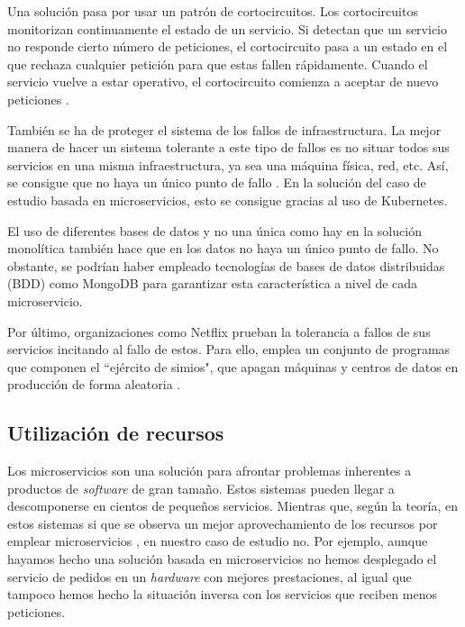 \documentclass[11pt,spanish,listoffigures]{tfgetsinf}
\begin{document}
Una solución pasa por usar un patrón de cortocircuitos. Los cortocircuitos monitorizan continuamente el estado de un servicio. Si detectan que un servicio no responde cierto número de peticiones, el cortocircuito pasa a un estado en el que rechaza cualquier petición para que estas fallen rápidamente. Cuando el servicio vuelve a estar operativo, el cortocircuito comienza a aceptar de nuevo peticiones \cite{Richards2016}.

También se ha de proteger el sistema de los fallos de infraestructura. La mejor manera de hacer un sistema tolerante a este tipo de fallos es no situar todos sus servicios en una misma infraestructura, ya sea una máquina física, red, etc. Así, se consigue que no haya un único punto de fallo \cite{Newman2015a}. En la solución del caso de estudio basada en microservicios, esto se consigue gracias al uso de Kubernetes.

El uso de diferentes bases de datos y no una única como hay en la solución monolítica también hace que en los datos no haya un único punto de fallo. No obstante, se podrían haber empleado tecnologías de bases de datos distribuidas (BDD) como MongoDB para garantizar esta característica a nivel de cada microservicio.

Por último, organizaciones como Netflix prueban la tolerancia a fallos de sus servicios incitando al fallo de estos. Para ello, emplea un conjunto de programas que componen el ``ejército de simios", que apagan máquinas y centros de datos en producción de forma aleatoria \cite{Lewis2014}.

\subsection{Utilización de recursos}

Los microservicios son una solución para afrontar problemas inherentes a productos de \textit{software} de gran tamaño. Estos sistemas pueden llegar a descomponerse en cientos de pequeños servicios. Mientras que, según la teoría, en estos sistemas si que se observa un mejor aprovechamiento de los recursos por emplear microservicios \cite{DelaTorre2018}, en nuestro caso de estudio no. Por ejemplo, aunque hayamos hecho una solución basada en microservicios no hemos desplegado el servicio de pedidos en un \textit{hardware} con mejores prestaciones, al igual que tampoco hemos hecho la situación inversa con los servicios que reciben menos peticiones.
\end{document}
